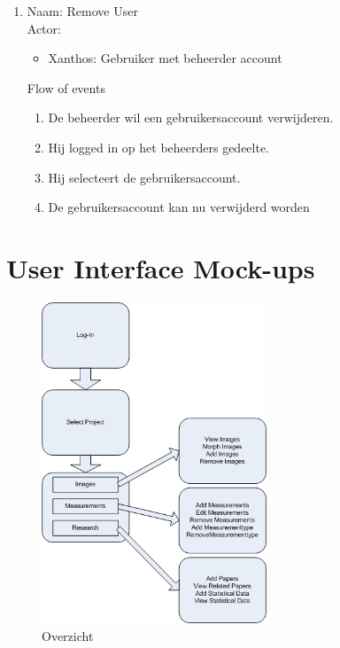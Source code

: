 \begin{enumerate}
\item   Naam: Remove User  \\
	Actor:
	\begin{itemize}
		\item Xanthos: Gebruiker met beheerder account
	\end{itemize}
	Flow of events
	\begin{enumerate}
	  \item De beheerder wil een gebruikersaccount verwijderen.
		\item Hij logged in op het beheerders gedeelte.
		\item Hij selecteert de gebruikersaccount.
		\item De gebruikersaccount kan nu verwijderd worden
	\end{enumerate}
	

\end{enumerate}

\newpage

\section{User Interface Mock-ups}
\begin{figure}[htp]
\begin{center}
	\includegraphics[width=0.6\textwidth]{NewConcept}
\caption{Overzicht}
\label{fig:NewConcept}
\end{center}
\end{figure}

